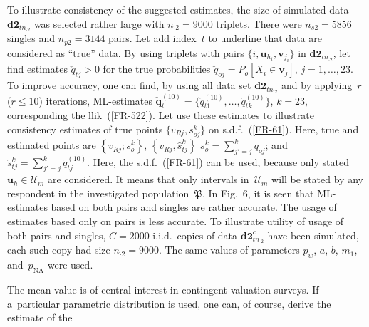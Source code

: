 \begin{multicols}{2}
 To illustrate consistency of the suggested estimates, the size of simulated data 
 $\mathbf{d2}_{t n_{\cdot 2}}$
 was selected rather large with $n_{\cdot 2} = 9000$ triplets. There were $n_{s 2} =5856$ singles 
 and $n_{p 2}=3144$  pairs. Let add index~$t$ to underline that data are considered as 
 ``true'' data. By using triplets with pairs
 $\{ i, \mathbf{u}_{h_i}, \mathbf{v}_{j_i}\}$ in $\mathbf{d2}_{t n_{\cdot 2}}$,  
let find estimates $\check q_{tj}>0$ for  the true probabilities 
 $\check q_{oj}=P_o [X_i \in \mathbf{v}_j]$, $j=1, \ldots, 23$. 
 To improve accuracy, one can find,
 by using all data set $\mathbf{d2}_{t n_{\cdot 2}}$ and by applying~$r$ 
 ($r\le 10$) iterations, ML-estimates
 $\check{\mathbf{q}}_t^{(10)} =\{ \check q_{t1}^{(10)}, \ldots, 
 \check q_{tk}^{(10)}\}$, $k=23$, corresponding the
 llik~(\ref{FR-522}). Let use these estimates to illustrate consistency estimates of true points
 $\{ v_{R j}, s_{oj}^k \}$ on s.d.f.~(\ref{FR-61}). 
 Here, true and  estimated points are 
$\left\{ v_{Rj}; s_o^k \right\}$,
$\left\{ v_{R j}, \hat s_{t j}^k \right\}$
$s_o^k =\sum\nolimits_{j'=j}^k q_{oj}$; 
and $\check s_{tj}^k =\sum\nolimits_{j'=j}^k \check q_{tj}^{(10)}$.
Here, the s.d.f.~(\ref{FR-61}) can be used, because  only stated
  $\mathbf{u}_h\in\mathcal{U}_m$ are considered.  It means that
 only intervals in~$\mathcal{U}_m$ will be stated by any respondent in the investigated 
 population~$\mathfrak {P}$. In Fig.~6, it is seen 
 that ML-estimates based on both pairs and singles are rather accurate.
The usage of estimates based only on pairs is less accurate. 
To illustrate utility of usage of both pairs
and singles,  $C=2000$ i.i.d.\ copies of data 
$\mathbf{d2}_{t n_{\cdot 2}}^c$ have been simulated, each such copy had size
$n_{\cdot 2}=9000.$ The same values of parameters $p_w$, $a$, $b$, $m_1$, 
and~$p_{\mathrm{NA}}$ were used.
{

}

The mean value is of central interest in  contingent valuation surveys.
If a~particular parametric distribution is used, one can, of course, derive the estimate of
 the\linebreak\vspace*{-12pt}

    \begin{center}  %
\vspace*{1pt}
\mbox{%
 \epsfxsize=77.817mm
 }
 
\end{center}


\end{multicols}
